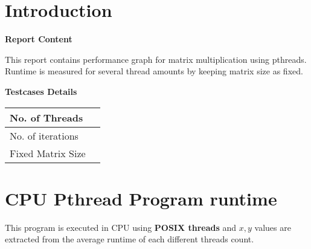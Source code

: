 \documentclass[12pt, a4paper]{article}
\title{\titlefont{Pthread Matrix Multiplication Runtime}}
\author{M.A.S SURANGA (CST140043)}
\date{}
\begin{document}
	\maketitle

	\vspace*{5\baselineskip} 
	\begin{center}
	\end{center}

	\newpage
	\setlength{\cftbeforesecskip}{6pt}
	\tableofcontents

	\newpage
	\section{Introduction}
	\hfill \break

	\textbf{Report Content}

	\hfill \break

	This report contains performance graph for matrix multiplication using pthreads. Runtime is measured for several thread amounts by keeping matrix size as fixed.  

	\hfill \break

	\textbf{Testcases Details}

	\hfill \break


	\begin{tabu} to 1 \textwidth { | X[l] | X[r] | }
		 \hline
		 No. of Threads &   \\
		 \hline
		 No. of iterations &   \\
		 \hline
		 Fixed Matrix Size &   \\
		 \hline
	\end{tabu}	
	

	\newpage

	\section{CPU Pthread Program runtime}

	\par
	This program is executed in CPU using \textbf{POSIX threads} and $x,y$ values are extracted from the average runtime of each different threads count.
	\hfill \break

\end{document}
